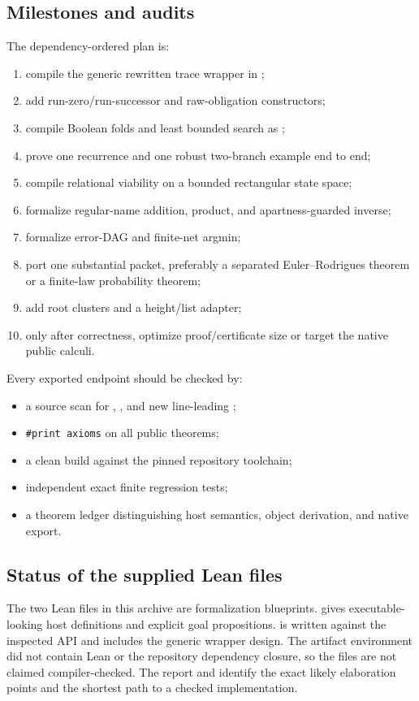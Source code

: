 \subsection{Milestones and audits}

The dependency-ordered plan is:
\begin{enumerate}[label=\arabic*.]
\item compile the generic rewritten trace wrapper in ;
\item add run-zero/run-successor and raw-obligation constructors;
\item compile Boolean folds and least bounded search as ;
\item prove one recurrence and one robust two-branch example end to end;
\item compile relational viability on a bounded rectangular state space;
\item formalize regular-name addition, product, and apartness-guarded inverse;
\item formalize error-DAG and finite-net argmin;
\item port one substantial packet, preferably a separated Euler--Rodrigues theorem or a finite-law probability theorem;
\item add root clusters and a height/list adapter;
\item only after correctness, optimize proof/certificate size or target the native public calculi.
\end{enumerate}

Every exported endpoint should be checked by:
\begin{itemize}
\item a source scan for , , and new line-leading ;
\item \texttt{\#print axioms} on all public theorems;
\item a clean build against the pinned repository toolchain;
\item independent exact finite regression tests;
\item a theorem ledger distinguishing host semantics, object derivation, and native export.
\end{itemize}

\subsection{Status of the supplied Lean files}

The two Lean files in this archive are formalization blueprints.   gives executable-looking host definitions and explicit goal propositions.   is written against the inspected  API and includes the generic wrapper design.  The artifact environment did not contain Lean or the repository dependency closure, so the files are not claimed compiler-checked.  The report and  identify the exact likely elaboration points and the shortest path to a checked implementation.

